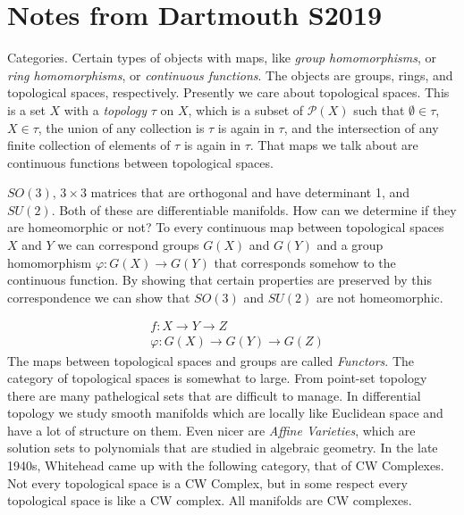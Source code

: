\documentclass[crop=false,class=book,oneside]{standalone}
\begin{document}
    \section{Notes from Dartmouth S2019}
        Categories. Certain types of objects with
        maps, like \textit{group homomorphisms}, or
        \textit{ring homomorphisms}, or
        \textit{continuous functions}. The objects
        are groups, rings, and topological spaces,
        respectively. Presently we care about
        topological spaces. This is a set $X$ with
        a \textit{topology} $\tau$ on $X$,
        which is a subset of $\mathcal{P}(X)$ such that
        $\emptyset\in\tau$, $X\in\tau$, the union of
        any collection is $\tau$ is again in $\tau$,
        and the intersection of any finite collection
        of elements of $\tau$ is again in $\tau$.
        That maps we talk about are continuous functions
        between topological spaces.
        \begin{example}
            $SO(3)$, $3\times{3}$ matrices that
            are orthogonal and have determinant 1, and
            $SU(2)$. Both of these are differentiable
            manifolds. How can we determine if they
            are homeomorphic or not? To every
            continuous map between topological spaces
            $X$ and $Y$ we can correspond groups
            $G(X)$ and $G(Y)$ and a group homomorphism
            $\varphi:G(X)\rightarrow{G}(Y)$ that
            corresponds somehow to the continuous
            function. By showing that certain properties
            are preserved by this correspondence we
            can show that $SO(3)$ and $SU(2)$ are not
            homeomorphic.
        \end{example}
        \begin{align}
            &f:X\rightarrow{Y}\rightarrow{Z}\\
            &\varphi:G(X)\rightarrow{G}(Y)
            \rightarrow{G}(Z)
        \end{align}
        The maps between topological spaces and groups
        are called \textit{Functors}. The category
        of topological spaces is somewhat to large.
        From point-set topology there are many
        pathelogical sets that are difficult to manage.
        In differential topology we study smooth
        manifolds which are locally like Euclidean space
        and have a lot of structure on them. Even
        nicer are \textit{Affine Varieties}, which
        are solution sets to polynomials that are
        studied in algebraic geometry. In the late
        1940s, Whitehead came up with the following
        category, that of CW Complexes. Not every
        topological space is a CW Complex, but in some
        respect every topological space is like a CW
        complex. All manifolds are CW complexes.
\end{document}
